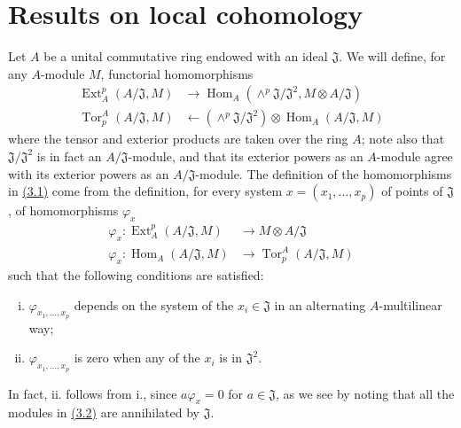\documentclass{article}
\theoremstyle{plain}
\theoremstyle{definition}
\newcommand{\from}{\leftarrow}
\DeclareMathOperator{\Ext}{Ext}
\DeclareMathOperator{\Hom}{Hom}
\DeclareMathOperator{\Tor}{Tor}
\newcommand{\oldpage}[1]{\marginpar{\footnotesize$\Big\vert$ \textit{p.~#1}}}
\begin{document}
\section{Results on local cohomology}
\label{section3}

Let $A$ be a unital commutative ring endowed with an ideal $\mathfrak{J}$.
We will define, for any $A$-module $M$, functorial homomorphisms
\[
\label{3.1}
  \begin{aligned}
    \Ext_A^p(A/\mathfrak{J},M) &\to \Hom_A(\wedge^p\mathfrak{J}/\mathfrak{J}^2,M\otimes A/\mathfrak{J})
  \\\Tor_p^A(A/\mathfrak{J},M) &\from (\wedge^p\mathfrak{J}/\mathfrak{J}^2)\otimes\Hom_A(A/\mathfrak{J},M)
  \end{aligned}
\tag{3.1}
\]
where the tensor and exterior products are taken over the ring $A$;
note also that $\mathfrak{J}/\mathfrak{J}^2$ is in fact an $A/\mathfrak{J}$-module, and that its exterior powers as an $A$-module agree with its exterior powers as an $A/\mathfrak{J}$-module.
The definition of the homomorphisms in \hyperref[3.1]{(3.1)} come from the definition, for every system $x=(x_1,\ldots,x_p)$ of points of $\mathfrak{J}$, of homomorphisms $\varphi_x$
\[
\label{3.2}
  \begin{aligned}
    \varphi_x\colon \Ext_A^p(A/\mathfrak{J},M) &\to M\otimes A/\mathfrak{J}
  \\\varphi_x\colon \Hom_A(A/\mathfrak{J},M) &\to \Tor_p^A(A/\mathfrak{J},M)
  \end{aligned}
\tag{3.2}
\]
such that the following conditions are satisfied:
\oldpage{149-06}
\begin{enumerate}[i.]
  \item $\varphi_{x_1,\ldots,x_p}$ depends on the system of the $x_i\in\mathfrak{J}$ in an alternating $A$-multilinear way;
  \item $\varphi_{x_1,\ldots,x_p}$ is zero when any of the $x_i$ is in $\mathfrak{J}^2$.
\end{enumerate}

In fact, ii. follows from i., since $a\varphi_x=0$ for $a\in\mathfrak{J}$, as we see by noting that all the modules in \hyperref[3.2]{(3.2)} are annihilated by $\mathfrak{J}$.
\end{document}
